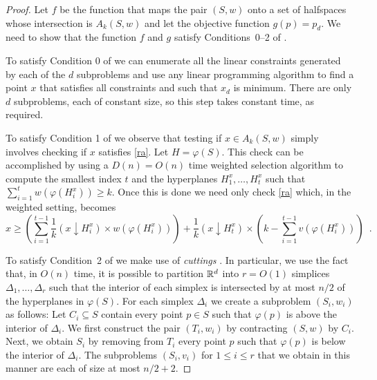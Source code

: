 \documentclass[lotsofwhite]{patmorin}
\newcommand{\drop}{\!\!\downarrow\!\!}
\newcommand{\dual}{\varphi}
\begin{document}
\begin{proof}
Let $f$ be the function that maps the pair $(S,w)$ onto a set of
halfspaces whose intersection is $A_k(S,w)$ and let the objective
function $g(p)=p_d$.  We need to show that the function $f$ and $g$
satisfy
Conditions~0--2 of .

To satisfy Condition 0 of  we can enumerate all the
linear constraints generated by each of the $d$ subproblems and use
any linear programming algorithm to find a point $x$ that satisfies
all constraints and such that $x_d$ is minimum.  There are only $d$
subproblems, each of constant size, so this step takes constant time,
as required.

To satisfy Condition 1 of  we observe that testing if
$x\in A_k(S,w)$ simply involves checking if $x$ satisfies \eqref{ra}.
Let $H=\dual(S)$.  This check can be accomplished by using a
$D(n)=O(n)$ time weighted selection algorithm
\cite[Exercise~9-2]{clrs01} to compute the smallest index $t$ and the
hyperplanes $H_{1}^x,\ldots,H_{t}^x$ such that
$\sum_{i=1}^tw(\dual(H_{i}^x)) \ge k$.  Once this is done we need only
check \eqref{ra} which, in the weighted setting, becomes 
\[
     x \ge \left(\sum_{i=1}^{t-1} \frac{1}{k}(x\drop
H_i^x)\times w(\dual(H_i^x))\right) 
   + \frac{1}{k}(x\drop H_t^x) \times \left(k-\sum_{i=1}^{t-1} v(\dual(H_{i}^x)) \right)
\enspace .
\]

To satisfy Condition~2 of  we make use of \emph{cuttings}
\cite[Section~4.7]{mat02}.  In particular, we use the fact that, in
$O(n)$ time, it is possible to partition $\mathbb{R}^d$ into $r=O(1)$
simplices $\Delta_1,\ldots,\Delta_r$ such that the interior of each
simplex is intersected by at most $n/2$ of the hyperplanes in
$\dual(S)$.  For each simplex $\Delta_i$ we create a subproblem
$(S_i,w_i)$ as follows: Let $C_i\subseteq S$ contain every point $p\in
S$ such that $\dual(p)$ is above the interior of $\Delta_i$.  We first
construct the pair $(T_i,w_i)$ by contracting $(S,w)$ by $C_i$.  Next,
we obtain $S_i$ by removing from $T_i$ every point $p$ such that
$\dual(p)$ is below the interior of $\Delta_i$.  The subproblems
$(S_i,v_i)$ for $1\le i\le r$ that we obtain in this manner are each
of size at most $n/2+2$.


\end{proof}
\end{document}
